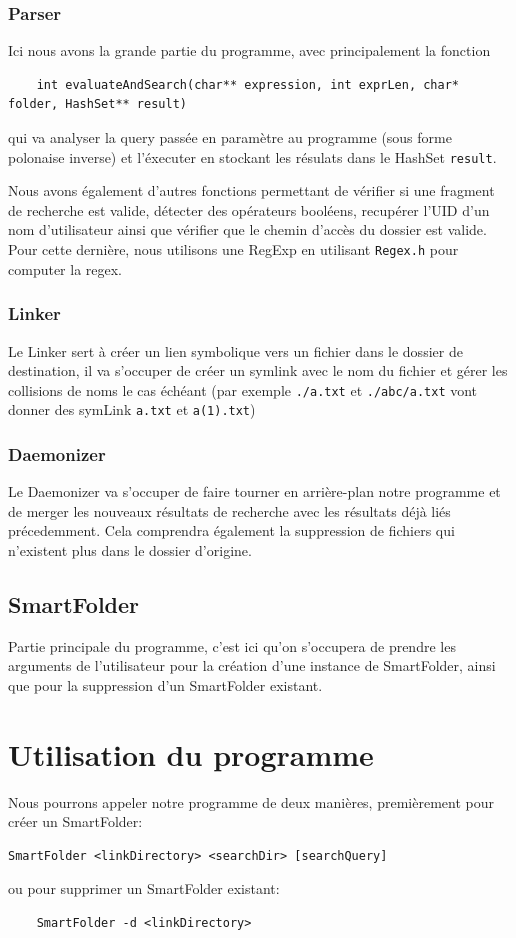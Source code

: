 \documentclass[a4paper]{article}
\begin{document}
\subsubsection{Parser}
Ici nous avons la grande partie du programme, avec principalement la fonction
\begin{verbatim}
	int evaluateAndSearch(char** expression, int exprLen, char* folder, HashSet** result)
\end{verbatim}
qui va analyser la query passée en paramètre au programme (sous forme polonaise inverse) et l'éxecuter en stockant les résulats dans le HashSet \verb+result+.

Nous avons également d'autres fonctions permettant de vérifier si une fragment de recherche est valide, détecter des opérateurs booléens, recupérer l'UID d'un nom d'utilisateur ainsi que vérifier que le chemin d'accès du dossier est valide. Pour cette dernière, nous utilisons une RegExp en utilisant \verb+Regex.h+ pour computer la regex.
\subsubsection{Linker}
Le Linker sert à créer un lien symbolique vers un fichier dans le dossier de destination, il va s'occuper de créer un symlink avec le nom du fichier et gérer les collisions de noms le cas échéant (par exemple \verb+./a.txt+ et \verb+./abc/a.txt+ vont donner des symLink \verb+a.txt+ et \verb+a(1).txt+)
\subsubsection{Daemonizer}
Le Daemonizer va s'occuper de faire tourner en arrière-plan notre programme et de merger les nouveaux résultats de recherche avec les résultats déjà liés précedemment. Cela comprendra également la suppression de fichiers qui n'existent plus dans le dossier d'origine.
\subsection{SmartFolder}
Partie principale du programme, c'est ici qu'on s'occupera de prendre les arguments de l'utilisateur pour la création d'une instance de SmartFolder, ainsi que pour la suppression d'un SmartFolder existant.
\section{Utilisation du programme}
Nous pourrons appeler notre programme de deux manières, premièrement pour créer un SmartFolder:
\begin{verbatim}
SmartFolder <linkDirectory> <searchDir> [searchQuery]
\end{verbatim}
ou pour supprimer un SmartFolder existant:
\begin{verbatim}
	SmartFolder -d <linkDirectory>
\end{verbatim}
\end{document}
